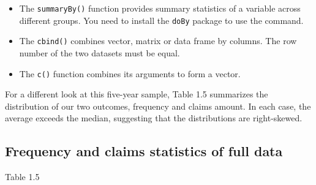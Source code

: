 \documentclass[]{book}
\theoremstyle{definition}
\theoremstyle{definition}
\theoremstyle{definition}
\theoremstyle{remark}
\begin{document}
\begin{itemize}
\item
  The \texttt{summaryBy()} function provides summary statistics of a
  variable across different groups. You need to install the
  \texttt{doBy} package to use the command.
\item
  The \texttt{cbind()} combines vector, matrix or data frame by columns.
  The row number of the two datasets must be equal.
\item
  The \texttt{c()} function combines its arguments to form a vector.
\end{itemize}

For a different look at this five-year sample, Table 1.5 summarizes the
distribution of our two outcomes, frequency and claims amount. In each
case, the average exceeds the median, suggesting that the distributions
are right-skewed.

\subsection{Frequency and claims statistics of full
data}\label{frequency-and-claims-statistics-of-full-data}

Table 1.5
\end{document}
